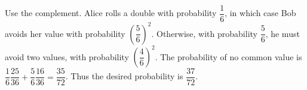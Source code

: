 Use the complement. Alice rolls a double with probability $\dfrac{1}{6}$, in which case Bob avoids her value with probability $(\dfrac{5}{6})^2$. Otherwise, with probability $\dfrac{5}{6}$, he must avoid two values, with probability $(\dfrac{4}{6})^2$. The probability of no common value is $\dfrac{1}{6}\dfrac{25}{36}+\dfrac{5}{6}\dfrac{16}{36}=\dfrac{35}{72}$. Thus the desired probability is $\boxed{\dfrac{37}{72}}$.
